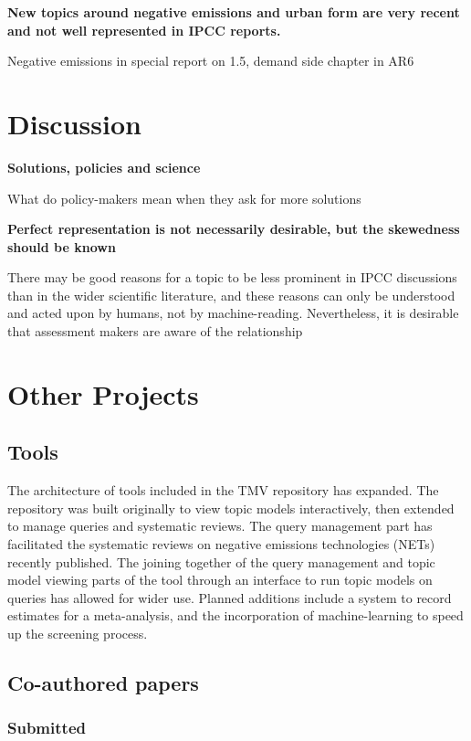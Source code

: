\documentclass{article}
\begin{document}
\bigskip
\noindent\textbf{New topics around negative emissions and urban form are very recent and not well represented in IPCC reports.}

Negative emissions in special report on 1.5, demand side chapter in AR6



\section*{Discussion}

\bigskip
\noindent\textbf{Solutions, policies and science}

What do policy-makers mean when they ask for more solutions

\bigskip
\noindent\textbf{Perfect representation is not necessarily desirable, but the skewedness should be known}

There may be good reasons for a topic to be less prominent in IPCC discussions than in the wider scientific literature, and these reasons can only be understood and acted upon by humans, not by machine-reading. Nevertheless, it is desirable that assessment makers are aware of the relationship 


\section{Other Projects}

\subsection{Tools}
The architecture of tools included in the TMV repository has expanded. The repository was built originally to view topic models interactively,  then extended to manage queries and systematic reviews. The query management part has facilitated the systematic reviews on negative emissions technologies (NETs) recently published. The joining together of the query management and topic model viewing parts of the tool through an interface to run topic models on queries has allowed for wider use. Planned additions include a system to record estimates for a meta-analysis, and the incorporation of machine-learning to speed up the screening process.

\subsection{Co-authored papers}

\subsubsection{Submitted}
\end{document}

